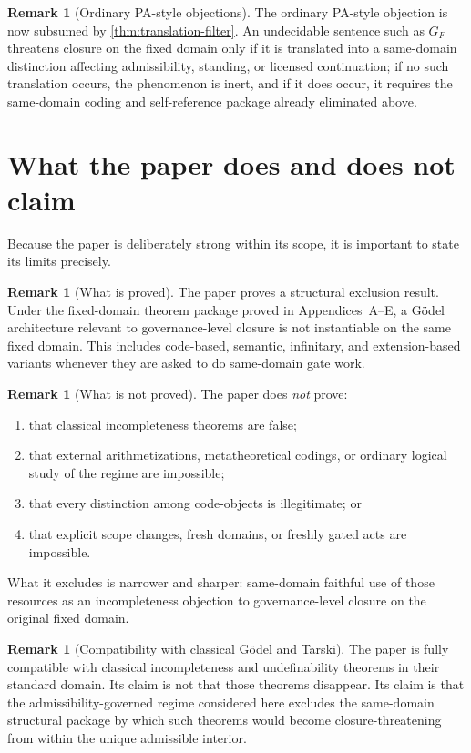 \documentclass[11pt]{article}
\theoremstyle{plain}
\theoremstyle{definition}
\newtheorem{remark}[theorem]{Remark}
\begin{document}
\begin{remark}[Ordinary PA-style objections]
The ordinary PA-style objection is now subsumed by \cref{thm:translation-filter}. An undecidable sentence such as $G_F$ threatens closure on the fixed domain only if it is translated into a same-domain distinction affecting admissibility, standing, or licensed continuation; if no such translation occurs, the phenomenon is inert, and if it does occur, it requires the same-domain coding and self-reference package already eliminated above.
\end{remark}

\section{What the paper does and does not claim}

Because the paper is deliberately strong within its scope, it is important to state its limits precisely.

\begin{remark}[What is proved]
The paper proves a structural exclusion result. Under the fixed-domain theorem package proved in Appendices~A--E, a G\"odel architecture relevant to governance-level closure is not instantiable on the same fixed domain. This includes code-based, semantic, infinitary, and extension-based variants whenever they are asked to do same-domain gate work.
\end{remark}

\begin{remark}[What is not proved]
The paper does \emph{not} prove:
\begin{enumerate}[label=(\roman*), leftmargin=2.5em]
    \item that classical incompleteness theorems are false;
    \item that external arithmetizations, metatheoretical codings, or ordinary logical study of the regime are impossible;
    \item that every distinction among code-objects is illegitimate; or
    \item that explicit scope changes, fresh domains, or freshly gated acts are impossible.
\end{enumerate}
What it excludes is narrower and sharper: same-domain faithful use of those resources as an incompleteness objection to governance-level closure on the original fixed domain.
\end{remark}

\begin{remark}[Compatibility with classical G\"odel and Tarski]
The paper is fully compatible with classical incompleteness and undefinability theorems in their standard domain. Its claim is not that those theorems disappear. Its claim is that the admissibility-governed regime considered here excludes the same-domain structural package by which such theorems would become closure-threatening from within the unique admissible interior.
\end{remark}
\end{document}
